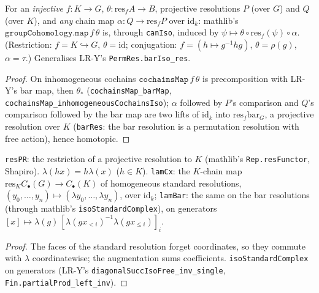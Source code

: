 \begin{theorem}\label{thm:m6-map-res}
  \leanok
  For an \emph{injective} $f\colon K\to G$, $\theta\colon\mathrm{res}_fA\to B$, projective resolutions $P$ (over $G$) and $Q$ (over $K$), and
  \emph{any} chain map $\alpha\colon Q\to\mathrm{res}_fP$ over $\mathrm{id}_k$: mathlib's $\texttt{groupCohomology.map}\,f\,\theta$ is,
  through \texttt{canIso}, induced by $\psi\mapsto\theta\circ\mathrm{res}_f(\psi)\circ\alpha$. (Restriction: $f=K\hookrightarrow G$,
  $\theta=\mathrm{id}$; conjugation: $f=(h\mapsto g^{-1}hg)$, $\theta=\rho(g)$, $\alpha=\tau$.) Generalises LR-Y's
  \texttt{PermRes.barIso\_res}.
\end{theorem}
\begin{proof}
  \leanok
  On inhomogeneous cochains $\texttt{cochainsMap}\,f\,\theta$ is precomposition with LR-Y's bar map, then $\theta_*$
  (\texttt{cochainsMap\_barMap}, \texttt{cochainsMap\_inhomogeneousCochainsIso}); $\alpha$ followed by $P$'s comparison and $Q$'s
  comparison followed by the bar map are two lifts of $\mathrm{id}_k$ into $\mathrm{res}_f\mathrm{bar}_G$, a projective resolution over
  $K$ (\texttt{barRes}: the bar resolution is a permutation resolution with free action), hence homotopic.
\end{proof}

\begin{definition}\label{def:m6-lam}
  \leanok
  \texttt{resPR}: the restriction of a projective resolution to $K$ (mathlib's \texttt{Rep.resFunctor}, Shapiro). $\lambda(hx)=h\lambda(x)$
  ($h\in K$). \texttt{lamCx}: the $K$-chain map $\mathrm{res}_KC_\bullet(G)\to C_\bullet(K)$ of homogeneous standard resolutions,
  $(y_0,\dots,y_n)\mapsto(\lambda y_0,\dots,\lambda y_n)$, over $\mathrm{id}_k$; \texttt{lamBar}: the same on the bar resolutions
  (through mathlib's \texttt{isoStandardComplex}), on generators $[x]\mapsto\lambda(g)\,[\lambda(gx_{<i})^{-1}\lambda(gx_{\le i})]_i$.
\end{definition}
\begin{proof}
  \leanok
  The faces of the standard resolution forget coordinates, so they commute with $\lambda$ coordinatewise; the augmentation sums
  coefficients. \texttt{isoStandardComplex} on generators (LR-Y's \texttt{diagonalSuccIsoFree\_inv\_single},
  \texttt{Fin.partialProd\_left\_inv}).
\end{proof}

